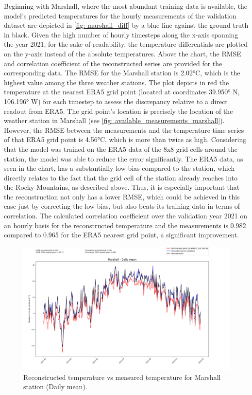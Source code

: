 Beginning with Marshall, where the most abundant training data is available, the model's predicted temperatures for the hourly measurements of the validation dataset are depicted in \autoref{fig: marshall_diff} by a blue line against the ground truth in black.
Given the high number of hourly timesteps along the x-axis spanning the year 2021, for the sake of readability, the temperature differentials are plotted on the y-axis instead of the absolute temperatures.
Above the chart, the RMSE and correlation coefficient of the reconstructed series are provided for the corresponding data.
The RMSE for the Marshall station is 2.02°C, which is the highest value among the three weather stations.
The plot depicts in red the temperature at the nearest ERA5 grid point (located at coordinates 39.950° N, 106.196° W) for each timestep to assess the discrepancy relative to a direct readout from ERA5.
The grid point's location is precisely the location of the weather station in Marshall (see \autoref{fig: available_measurements_marshall}).
However, the RMSE between the measurements and the temperature time series of that ERA5 grid point is 4.56°C, which is more than twice as high.
Considering that the model was trained on the ERA5 data of the 8x8 grid cells around the station, the model was able to reduce the error significantly.
The ERA5 data, as seen in the chart, has a substantially low bias compared to the station, which directly relates to the fact that the grid cell of the station already reaches into the Rocky Mountains, as described above.
Thus, it is especially important that the reconstruction not only has a lower RMSE, which could be achieved in this case just by correcting the low bias, but also beats its training data in terms of correlation.
The calculated correlation coefficient over the validation year 2021 on an hourly basis for the reconstructed temperature and the measurements is 0.982 compared to 0.965 for the ERA5 nearest grid point, a significant improvement.

\begin{figure}
    \centering
    \includegraphics[width=1.00\textwidth]{resources/images/charts/marshall_eval_grib_final/Marshall - Daily mean.png}
    \caption{Reconstructed temperature vs measured temperature for Marshall station (Daily mean).}
    \label{fig: marshall_daily}
\end{figure}

